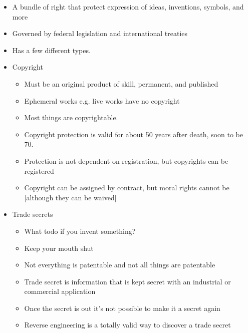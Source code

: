 \documentclass[10pt]{article}
\begin{document}
\begin{itemize}
	\item A bundle of right that protect expression of ideas, inventions, symbols, and more
	\item Governed by federal legislation and international treaties
	\item Has a few different types.
	\item Copyright
		\begin{itemize}
			\item Must be an original product of skill, permanent, and published
			\item Ephemeral works e.g. live works have no copyright
			\item Most things are copyrightable.
			\item Copyright protection is valid for about 50 years after death, soon to be 70.
			\item Protection is not dependent on registration, but copyrights can be registered
			\item Copyright can be assigned by contract, but moral rights cannot be [although they can be waived]
		\end{itemize}

	\item Trade secrets

\begin{itemize}
	\item What todo if you invent something?
	\item Keep your mouth shut
	\item Not everything is patentable and not all things are patentable
	\item Trade secret is information that is kept secret with an industrial or commercial application
	\item Once the secret is out it's not possible to make it a secret again
	\item Reverse engineering is a totally valid way to discover a trade secret


\end{itemize}
\end{itemize}
\end{document}
